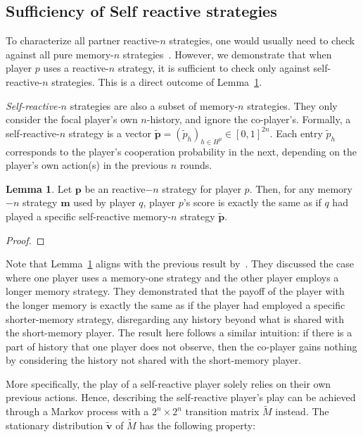 \documentclass{article}
\theoremstyle{definition}
\newtheorem{lemma}[theorem]{Lemma}
\begin{document}
\subsection{Sufficiency of Self reactive strategies}\label{section:self_reactive_sufficiency}

To characterize all partner reactive-$n$ strategies, one would usually need
to check against all pure memory-$n$ strategies~\cite{mcavoy:PRSA:2019}.
However, we demonstrate that when player $p$ uses a reactive-$n$
strategy, it is sufficient to check only against self-reactive-$n$
strategies. This is a direct outcome of Lemma~\ref{lemma:self_reactive_sufficiency}.

{\it Self-reactive-$n$} strategies are also a subset of memory-$n$ strategies.
They only consider the focal player's own $n$-history, and ignore the co-player's.
Formally, a self-reactive-$n$ strategy is a vector
$\mathbf{\tilde{p}} = (\tilde{p}_h)_{h \in H^p} \in [0, 1] ^ {2n}$. Each entry
$\tilde{p}_h$ corresponds to the player's cooperation probability in the next,
depending on the player's own action(s) in the previous $n$ rounds.

\begin{lemma}\label{lemma:self_reactive_sufficiency}
  Let $\mathbf{p}$ be an reactive$-n$ strategy for player $p$. Then, for any
  memory$-n$ strategy $\mathbf{m}$ used by player $q$, player $p$'s score is
  exactly the same as if $q$ had played a specific self-reactive memory-$n$
  strategy $\mathbf{\tilde{p}}$.
\end{lemma}

\begin{proof}
\end{proof}

Note that Lemma~\ref{lemma:self_reactive_sufficiency} aligns with the previous
result by~\cite{press:PNAS:2012}. They discussed the case where one player uses
a memory-one strategy and the other player employs a longer memory strategy.
They demonstrated that the payoff of the player with the longer memory is
exactly the same as if the player had employed a specific shorter-memory
strategy, disregarding any history beyond what is shared with the short-memory
player. The result here follows a similar intuition: if there is a part of
history that one player does not observe, then the co-player gains nothing by
considering the history not shared with the short-memory player.

More specifically, the play of a self-reactive player solely relies on their own
previous actions. Hence, describing the self-reactive player's play can be
achieved through a Markov process with a $2^{n}\!\times\!2^{n}$ transition
matrix $\tilde{M}$ instead. The stationary distribution $\mathbf{\tilde{v}}$ of
$\tilde{M}$ has the following property:
\end{document}
